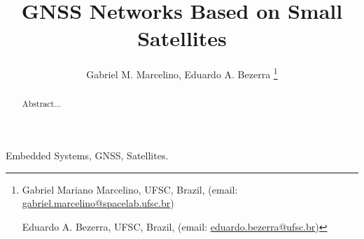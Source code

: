 \documentclass[journal]{IEEEtran}
\title{GNSS Networks Based on Small Satellites}
\author{Gabriel M. Marcelino, Eduardo A. Bezerra
	\thanks{
	Gabriel Mariano Marcelino, UFSC, Brazil, (email: \href{mailto:gabriel.marcelino@spacelab.ufsc.br}{gabriel.marcelino@spacelab.ufsc.br})

	Eduardo A. Bezerra, UFSC, Brazil, (email: \href{mailto:eduardo.bezerra@ufsc.br}{eduardo.bezerra@ufsc.br})
	}}
\date{}
\begin{document}
    \maketitle

    \begin{abstract}
        Abstract...
    \end{abstract}

    \begin{IEEEkeywords}
        Embedded Systems, GNSS, Satellites.
    \end{IEEEkeywords}

    
    
    
    
    
    
    
\end{document}
